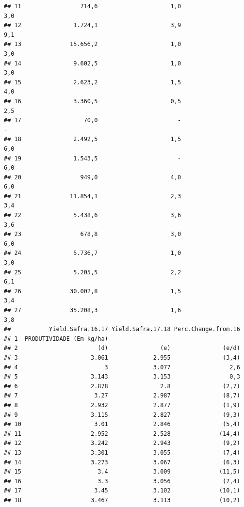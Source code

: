 \documentclass[
]{book}
\begin{document}
\begin{verbatim}
## 11                 714,6                     1,0                      3,0
## 12               1.724,1                     3,9                      9,1
## 13              15.656,2                     1,0                      3,0
## 14               9.602,5                     1,0                      3,0
## 15               2.623,2                     1,5                      4,0
## 16               3.360,5                     0,5                      2,5
## 17                  70,0                       -                        -
## 18               2.492,5                     1,5                      6,0
## 19               1.543,5                       -                      6,0
## 20                 949,0                     4,0                      6,0
## 21              11.854,1                     2,3                      3,4
## 22               5.438,6                     3,6                      3,6
## 23                 678,8                     3,0                      6,0
## 24               5.736,7                     1,0                      3,0
## 25               5.205,5                     2,2                      6,1
## 26              30.002,8                     1,5                      3,4
## 27              35.208,3                     1,6                      3,8
##           Yield.Safra.16.17 Yield.Safra.17.18 Perc.Change.from.16
## 1  PRODUTIVIDADE (Em kg/ha)                                      
## 2                       (d)               (e)               (e/d)
## 3                     3.061             2.955               (3,4)
## 4                         3             3.077                 2,6
## 5                     3.143             3.153                 0,3
## 6                     2.878               2.8               (2,7)
## 7                      3.27             2.987               (8,7)
## 8                     2.932             2.877               (1,9)
## 9                     3.115             2.827               (9,3)
## 10                     3.01             2.846               (5,4)
## 11                    2.952             2.528              (14,4)
## 12                    3.242             2.943               (9,2)
## 13                    3.301             3.055               (7,4)
## 14                    3.273             3.067               (6,3)
## 15                      3.4             3.009              (11,5)
## 16                      3.3             3.056               (7,4)
## 17                     3.45             3.102              (10,1)
## 18                    3.467             3.113              (10,2)

\end{verbatim}
\end{document}
